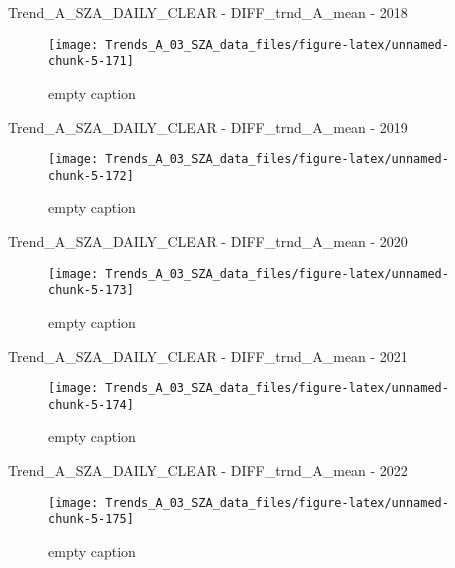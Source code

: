 \documentclass[
  10pt,
  a4paper,oneside]{article}
\begin{document}
Trend\_A\_SZA\_DAILY\_CLEAR - DIFF\_trnd\_A\_mean - 2018

\begin{figure}[!ht]

{\centering \texttt{[image: Trends\_A\_03\_SZA\_data\_files/figure-latex/unnamed-chunk-5-171]} 

}

\caption{ empty caption }\label{fig:unnamed-chunk-5-171}
\end{figure}

Trend\_A\_SZA\_DAILY\_CLEAR - DIFF\_trnd\_A\_mean - 2019

\begin{figure}[!ht]

{\centering \texttt{[image: Trends\_A\_03\_SZA\_data\_files/figure-latex/unnamed-chunk-5-172]} 

}

\caption{ empty caption }\label{fig:unnamed-chunk-5-172}
\end{figure}

Trend\_A\_SZA\_DAILY\_CLEAR - DIFF\_trnd\_A\_mean - 2020

\begin{figure}[!ht]

{\centering \texttt{[image: Trends\_A\_03\_SZA\_data\_files/figure-latex/unnamed-chunk-5-173]} 

}

\caption{ empty caption }\label{fig:unnamed-chunk-5-173}
\end{figure}

Trend\_A\_SZA\_DAILY\_CLEAR - DIFF\_trnd\_A\_mean - 2021

\begin{figure}[!ht]

{\centering \texttt{[image: Trends\_A\_03\_SZA\_data\_files/figure-latex/unnamed-chunk-5-174]} 

}

\caption{ empty caption }\label{fig:unnamed-chunk-5-174}
\end{figure}

Trend\_A\_SZA\_DAILY\_CLEAR - DIFF\_trnd\_A\_mean - 2022

\begin{figure}[!ht]

{\centering \texttt{[image: Trends\_A\_03\_SZA\_data\_files/figure-latex/unnamed-chunk-5-175]} 

}

\caption{ empty caption }\label{fig:unnamed-chunk-5-175}
\end{figure}
\end{document}
